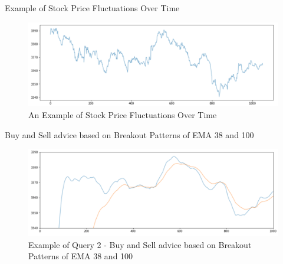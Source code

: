 \documentclass[9pt]{beamer}
\begin{document}


\begin{frame}[fragile]{Example of Stock Price Fluctuations Over Time }



    \begin{figure}
        \begin{center}
            \includegraphics[width=1\textwidth]{../paper/images/stock_example.png}
            \caption{An Example of Stock Price Fluctuations Over Time}
            \label{fig:stock}
        \end{center}
    \end{figure}
    
    
    
\end{frame}




\begin{frame}[fragile]{Buy and Sell advice based on Breakout Patterns of EMA 38 and 100  }


    \begin{figure}
        \begin{center}
            \includegraphics[width=1\textwidth]{../paper/images/query2_example.png}
            \caption{Example of Query 2 - Buy and Sell advice based on Breakout Patterns of EMA 38 and 100}
            \label{fig:EMAs}
         \end{center}
    \end{figure}
    
\end{frame}
\end{document}
